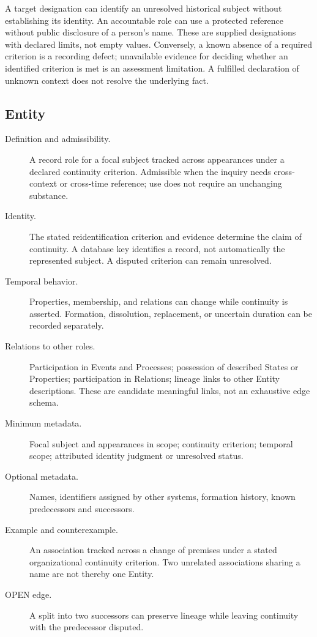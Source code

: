 \documentclass[11pt,a4paper]{article}
\begin{document}
A target designation can identify an unresolved historical subject without establishing its identity. An accountable role can use a protected reference without public disclosure of a person's name. These are supplied designations with declared limits, not empty values. Conversely, a known absence of a required criterion is a recording defect; unavailable evidence for deciding whether an identified criterion is met is an assessment limitation. A fulfilled declaration of unknown context does not resolve the underlying fact.

\subsection{Entity}
\begin{description}
\item[Definition and admissibility.] A record role for a focal subject tracked across appearances under a declared continuity criterion. Admissible when the inquiry needs cross-context or cross-time reference; use does not require an unchanging substance.
\item[Identity.] The stated reidentification criterion and evidence determine the claim of continuity. A database key identifies a record, not automatically the represented subject. A disputed criterion can remain unresolved.
\item[Temporal behavior.] Properties, membership, and relations can change while continuity is asserted. Formation, dissolution, replacement, or uncertain duration can be recorded separately.
\item[Relations to other roles.] Participation in Events and Processes; possession of described States or Properties; participation in Relations; lineage links to other Entity descriptions. These are candidate meaningful links, not an exhaustive edge schema.
\item[Minimum metadata.] Focal subject and appearances in scope; continuity criterion; temporal scope; attributed identity judgment or unresolved status.
\item[Optional metadata.] Names, identifiers assigned by other systems, formation history, known predecessors and successors.
\item[Example and counterexample.] An association tracked across a change of premises under a stated organizational continuity criterion. Two unrelated associations sharing a name are not thereby one Entity.
\item[OPEN edge.] A split into two successors can preserve lineage while leaving continuity with the predecessor disputed.
\end{description}
\end{document}
